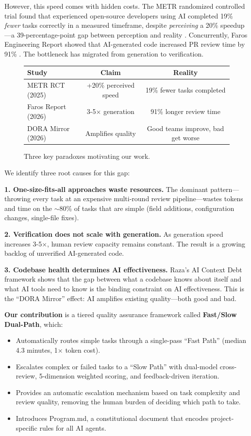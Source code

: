 \documentclass[11pt,a4paper]{article}
\begin{document}
However, this speed comes with hidden costs. The METR randomized controlled trial found that experienced open-source developers using AI completed 19\% \textit{fewer} tasks correctly in a measured timeframe, despite \textit{perceiving} a 20\% speedup---a 39-percentage-point gap between perception and reality \cite{metr2026}. Concurrently, Faros Engineering Report showed that AI-generated code increased PR review time by 91\% \cite{faros2026}. The bottleneck has migrated from generation to verification.

\begin{figure}[h]
\centering
\begin{tabular}{lcc}
\toprule
\textbf{Study} & \textbf{Claim} & \textbf{Reality} \\
\midrule
METR RCT (2025) & +20\% perceived speed & 19\% fewer tasks completed \\
Faros Report (2026) & 3-5$\times$ generation & 91\% longer review time \\
DORA Mirror (2026) & Amplifies quality & Good teams improve, bad get worse \\
\bottomrule
\end{tabular}
\caption{Three key paradoxes motivating our work.}
\label{tab:paradoxes}
\end{figure}

We identify three root causes for this gap:

\textbf{1. One-size-fits-all approaches waste resources.} The dominant pattern---throwing every task at an expensive multi-round review pipeline---wastes tokens and time on the $\sim$80\% of tasks that are simple (field additions, configuration changes, single-file fixes).

\textbf{2. Verification does not scale with generation.} As generation speed increases 3-5$\times$, human review capacity remains constant. The result is a growing backlog of unverified AI-generated code.

\textbf{3. Codebase health determines AI effectiveness.} Raza's AI Context Debt framework \cite{raza2026} shows that the gap between what a codebase knows about itself and what AI tools need to know is the binding constraint on AI effectiveness. This is the ``DORA Mirror'' effect: AI amplifies existing quality---both good and bad.

\textbf{Our contribution} is a tiered quality assurance framework called \textbf{Fast/Slow Dual-Path}, which:

\begin{itemize}
    \item Automatically routes simple tasks through a single-pass ``Fast Path'' (median 4.3 minutes, 1$\times$ token cost).
    \item Escalates complex or failed tasks to a ``Slow Path'' with dual-model cross-review, 5-dimension weighted scoring, and feedback-driven iteration.
    \item Provides an automatic escalation mechanism based on task complexity and review quality, removing the human burden of deciding which path to take.
    \item Introduces Program.md, a constitutional document that encodes project-specific rules for all AI agents.
\end{itemize}
\end{document}
